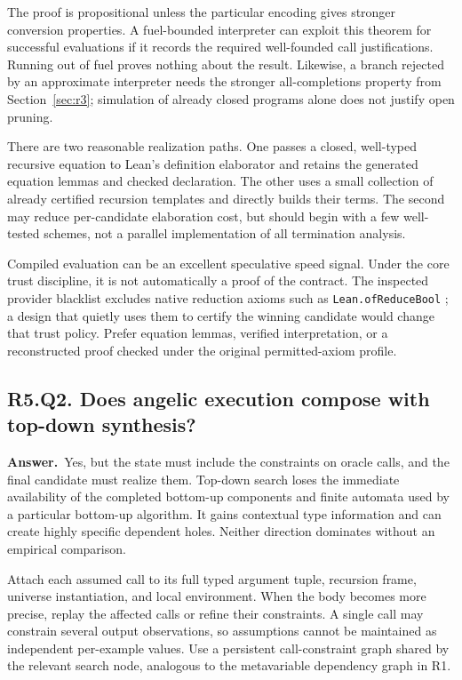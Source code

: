 \documentclass[11pt,a4paper]{article}
\theoremstyle{definition}
\theoremstyle{remark}
\newcommand{\code}[1]{\texttt{#1}}
\newcommand{\answer}{\par\noindent\textbf{Answer.}\ }
\newcommand{\qheading}[2]{\subsection{#1. #2}}
\begin{document}
The proof is propositional unless the particular encoding gives stronger
conversion properties. A fuel-bounded interpreter can exploit this theorem
for successful evaluations if it records the required well-founded call
justifications. Running out of fuel proves nothing about the result. Likewise,
a branch rejected by an approximate interpreter needs the stronger
all-completions property from Section~\ref{sec:r3}; simulation of already closed
programs alone does not justify open pruning.

There are two reasonable realization paths. One passes a closed, well-typed
recursive equation to Lean's definition elaborator and retains the generated
equation lemmas and checked declaration. The other uses a small collection of
already certified recursion templates and directly builds their terms. The
second may reduce per-candidate elaboration cost, but should begin with a few
well-tested schemes, not a parallel implementation of all termination analysis.

Compiled evaluation can be an excellent speculative speed signal. Under the
core trust discipline, it is not automatically a proof of the contract. The
inspected provider blacklist excludes native reduction axioms such as
\code{Lean.ofReduceBool} \cite{srcsearch}; a design that quietly uses them to
certify the winning candidate would change that trust policy. Prefer equation
lemmas, verified interpretation, or a reconstructed proof checked under the
original permitted-axiom profile.

\qheading{R5.Q2}{Does angelic execution compose with top-down synthesis?}
\answer Yes, but the state must include the constraints on oracle calls, and
the final candidate must realize them. Top-down search loses the immediate
availability of the completed bottom-up components and finite automata used
by a particular bottom-up algorithm. It gains contextual type information and
can create highly specific dependent holes. Neither direction dominates
without an empirical comparison.

Attach each assumed call to its full typed argument tuple, recursion frame,
universe instantiation, and local environment. When the body becomes more
precise, replay the affected calls or refine their constraints. A single call
may constrain several output observations, so assumptions cannot be maintained
as independent per-example values. Use a persistent call-constraint graph
shared by the relevant search node, analogous to the metavariable dependency
graph in R1.
\end{document}
